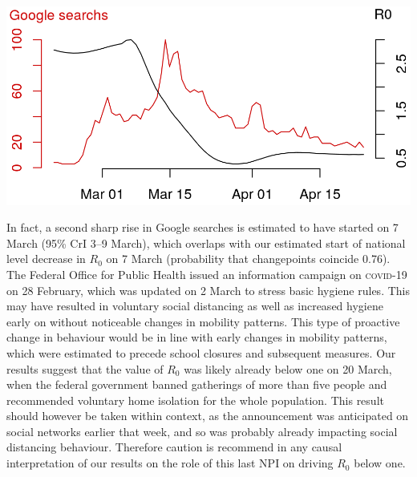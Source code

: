 \begin{marginfigure}[1\baselineskip]
\includegraphics{fig_covid-switzerland-npi/fig_supp/google_trends.png}
\end{marginfigure}
 In fact, a second sharp rise in Google searches is estimated to have started on 7 March (95\% CrI 3–9 March), which overlaps with our estimated start of national level decrease in $R_0$ on 7 March (probability that changepoints coincide 0.76). The Federal Office for Public Health issued an information campaign on \textsc{covid}-19 on 28 February, which was updated on 2 March to stress basic hygiene rules\cite{OFSP:NouvellesReglesHygiene:2020}. This may have resulted in voluntary social distancing as well as increased hygiene early on without noticeable changes in mobility patterns. This type of proactive change in behaviour would be in line with early changes in mobility patterns, which were estimated to precede school closures and subsequent measures. Our results suggest that the value of $R_0$ was likely already below one on 20 March, when the federal government banned gatherings of more than five people and recommended voluntary home isolation for the whole population. This result should however be taken within context, as the announcement was anticipated on social networks earlier that week, and so was probably already impacting social distancing behaviour. 
Therefore caution is recommend in any causal interpretation of our results on the role of this last NPI on driving $R_0$ below one.
